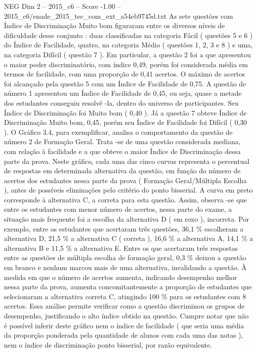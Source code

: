 \begin{textsample}{NEG Dim 2 – 2015\_c6 – Score -1.00 – 2015\_c6/enade\_2015\_tec\_com\_ext\_a54eb9745d.txt}
As sete questões com Índice de Discriminação Muito bom figuraram entre os diversos níveis de dificuldade desse conjunto : duas classificadas na categoria Fácil ( questões 5 e 6 ) do Índice de Facilidade, quatro, na categoria Médio ( questões 1, 2, 3 e 8 ) e uma, na categoria Difícil ( questão 7 ).
Em particular, a questão 2 foi a que apresentou o maior poder discriminatório, com índice 0,49, porém foi considerada média em termos de facilidade, com uma proporção de 0,41 acertos.
O máximo de acertos foi alcançado pela questão 5 com um Índice de Facilidade de 0,75.
A questão de número 1 apresentou um Índice de Facilidade de 0,45, ou seja, quase a metade dos estudantes conseguiu resolvê -la, dentro do universo de participantes.
Seu Índice de Discriminação foi Muito bom ( 0,40 ).
Já a questão 7 obteve Índice de Discriminação Muito bom, 0,45, porém seu Índice de Facilidade foi Difícil ( 0,30 ).
O Gráfico 3.4, para exemplificar, analisa o comportamento da questão de número 2 de Formação Geral.
Trata -se de uma questão considerada mediana, com relação à facilidade e a que obteve o maior Índice de Discriminação dessa parte da prova.
Neste gráfico, cada uma das cinco curvas representa o percentual de respostas em determinada alternativa da questão, em função do número de acertos dos estudantes nessa parte da prova ( Formação Geral/Múltipla Escolha ), antes de possíveis eliminações pelo critério do ponto bisserial.
A curva em preto corresponde à alternativa C, a correta para esta questão.
Assim, observa -se que entre os estudantes com menor número de acertos, nessa parte do exame, a situação mais frequente foi a escolha da alternativa D ( em roxo ), incorreta.
Por exemplo, entre os estudantes que acertaram três questões, 36,1 \% escolheram a alternativa D, 21,5 \% a alternativa C ( correta ), 16,6 \% a alternativa A, 14,1 \% a alternativa B e 11,5 \% a alternativa E.
Entre os que acertaram três respostas entre as questões de múltipla escolha de formação geral, 0,3 \% deixou a questão em branco e nenhum marcou mais de uma alternativa, invalidando a questão.
À medida em que o número de acertos aumenta, indicando desempenho melhor nessa parte da prova, aumenta concomitantemente a proporção de estudantes que selecionaram a alternativa correta C, atingindo 100 \% para os estudantes com 8 acertos.
Essa análise permite verificar como a questão discriminou os grupos de desempenho, justificando o alto índice obtido na questão.
Cumpre notar que não é possível inferir deste gráfico nem o índice de facilidade ( que seria uma média da proporção ponderada pela quantidade de alunos com cada uma das notas ), nem o índice de discriminação ponto bisserial, por razão equivalente.

\end{textsample}
